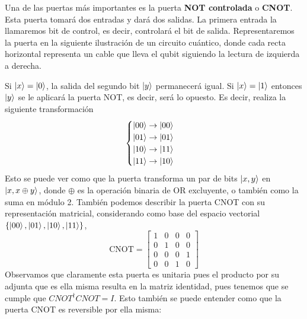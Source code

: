 \documentclass[a4paper]{article}
\numberwithin{equation}{section}
\begin{document}
Una de las puertas más importantes es la puerta \textbf{NOT controlada} o \textbf{CNOT}. Esta puerta tomará dos entradas y dará dos salidas. La primera entrada la llamaremos bit de control, es decir, controlará el bit de salida. Representaremos la puerta en la siguiente ilustración de un circuito cuántico, donde cada recta horizontal representa un cable que lleva el qubit siguiendo la lectura de izquierda a derecha.
\begin{figure}[h]
\centering
{}
\end{figure}
Si $\ket{x} = \ket{0}$, la salida del segundo bit $\ket{y}$ permanecerá igual. Si  $\ket{x} = \ket{1}$ entonces $\ket{y}$ se le aplicará la puerta NOT, es decir, será lo opuesto. Es decir, realiza la siguiente transformación
\begin{equation}
\begin{cases}
\ket{00} \rightarrow \ket{00} \\
\ket{01} \rightarrow \ket{01} \\
\ket{10} \rightarrow \ket{11} \\
\ket{11} \rightarrow \ket{10}
\end{cases}
\end{equation}
Esto se puede ver como que la puerta transforma un par de bits $\ket{x, y}$ en $\ket{x, x\oplus y}$, donde $\oplus$ es la operación binaria de OR excluyente, o también como la suma en módulo 2.
También podemos describir la puerta CNOT con su representación matricial, considerando como base del espacio vectorial $\lbrace \ket{00}, \ket{01}, \ket{10}, \ket{11} \rbrace$,
\begin{equation}
\textrm{CNOT} = \begin{bmatrix}
1 & 0 & 0 & 0 \\
0 & 1 & 0 & 0 \\
0 & 0 & 0 & 1 \\
0 & 0 & 1 & 0 
\end{bmatrix}
\end{equation}
Observamos que claramente esta puerta es unitaria pues el producto por su adjunta que es ella misma resulta en la matriz identidad, pues tenemos que se cumple que $CNOT^{\dagger} CNOT = I$.
Esto también se puede entender como que la puerta CNOT es reversible por ella misma:\\
\end{document}
